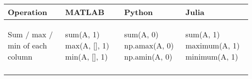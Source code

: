 \documentclass[10pt, landscape]{article}
\newenvironment{Shaded}{}{}
\newcommand{\DecValTok}[1]{\textcolor[rgb]{0.25,0.63,0.44}{{#1}}}
\newcommand{\FloatTok}[1]{\textcolor[rgb]{0.25,0.63,0.44}{{#1}}}
\newcommand{\BuiltInTok}[1]{{#1}}
\newcommand{\NormalTok}[1]{{#1}}
\begin{document}
\begin{multicols*}{2}
\begin{tabular}[ ]{@{}llll@{}}
\toprule
\begin{minipage}[b]{0.23\columnwidth}\raggedright\strut
Operation\strut
\end{minipage} & \begin{minipage}[b]{0.22\columnwidth}\raggedright\strut
MATLAB\strut
\end{minipage} & \begin{minipage}[b]{0.24\columnwidth}\raggedright\strut
Python\strut
\end{minipage} & \begin{minipage}[b]{0.20\columnwidth}\raggedright\strut
Julia\strut
\end{minipage}\tabularnewline
\midrule
\begin{minipage}[t]{0.23\columnwidth}\raggedright\strut
Sum / max / min of each column\strut
\end{minipage} & \begin{minipage}[t]{0.22\columnwidth}\raggedright\strut
\begin{Shaded}
\begin{Highlighting}[]
\NormalTok{sum(A, }\FloatTok{1}\NormalTok{)}
\NormalTok{max(A, [], }\FloatTok{1}\NormalTok{)}
\NormalTok{min(A, [], }\FloatTok{1}\NormalTok{)}
\end{Highlighting}
\end{Shaded}
\strut
\end{minipage} & \begin{minipage}[t]{0.24\columnwidth}\raggedright\strut
\begin{Shaded}
\begin{Highlighting}[]
\BuiltInTok{sum}\NormalTok{(A, }\DecValTok{0}\NormalTok{)}
\NormalTok{np.amax(A, }\DecValTok{0}\NormalTok{)}
\NormalTok{np.amin(A, }\DecValTok{0}\NormalTok{)}
\end{Highlighting}
\end{Shaded}
\strut
\end{minipage} & \begin{minipage}[t]{0.20\columnwidth}\raggedright\strut
\begin{Shaded}
\begin{Highlighting}[]
\NormalTok{sum(A, }\FloatTok{1}\NormalTok{)}
\NormalTok{maximum(A, }\FloatTok{1}\NormalTok{)}
\NormalTok{minimum(A, }\FloatTok{1}\NormalTok{)}
\end{Highlighting}
\end{Shaded}
\strut
\end{minipage}\tabularnewline
\begin{minipage}[t]{0.23\columnwidth}\raggedright\strut

\end{minipage}
\end{tabular}
\end{multicols*}
\end{document}

